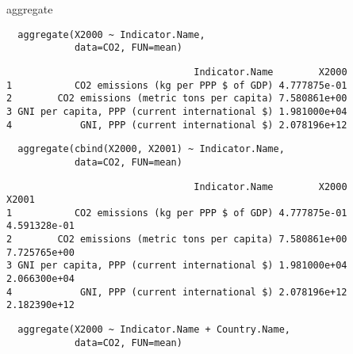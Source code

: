 \documentclass[xcolor={usenames,svgnames,dvipsnames}]{beamer}
\begin{document}
\begin{frame}[fragile,label=sec-3-6]{aggregate}
 \lstset{language=R,label= ,caption= ,numbers=none}
\begin{lstlisting}
  aggregate(X2000 ~ Indicator.Name,
            data=CO2, FUN=mean)
\end{lstlisting}

\begin{verbatim}
                                 Indicator.Name        X2000
1           CO2 emissions (kg per PPP $ of GDP) 4.777875e-01
2        CO2 emissions (metric tons per capita) 7.580861e+00
3 GNI per capita, PPP (current international $) 1.981000e+04
4            GNI, PPP (current international $) 2.078196e+12
\end{verbatim}

\lstset{language=R,label= ,caption= ,numbers=none}
\begin{lstlisting}
  aggregate(cbind(X2000, X2001) ~ Indicator.Name,
            data=CO2, FUN=mean)
\end{lstlisting}

\begin{verbatim}
                                 Indicator.Name        X2000        X2001
1           CO2 emissions (kg per PPP $ of GDP) 4.777875e-01 4.591328e-01
2        CO2 emissions (metric tons per capita) 7.580861e+00 7.725765e+00
3 GNI per capita, PPP (current international $) 1.981000e+04 2.066300e+04
4            GNI, PPP (current international $) 2.078196e+12 2.182390e+12
\end{verbatim}

\lstset{language=R,label= ,caption= ,numbers=none}
\begin{lstlisting}
  aggregate(X2000 ~ Indicator.Name + Country.Name,
            data=CO2, FUN=mean)
\end{lstlisting}


\end{frame}
\end{document}
